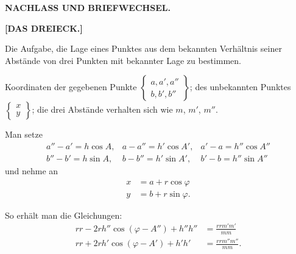 \begin{center}
\textbf{\Large NACHLASS UND BRIEFWECHSEL.}\par\bigskip
\textbf{[DAS DREIECK.]}
\end{center}
\bigskip

Die Aufgabe, die Lage eines Punktes aus dem bekannten Verhältnis seiner Abstände von drei Punkten mit bekannter Lage zu bestimmen.

Koordinaten der gegebenen Punkte $\left\{\begin{array}{c}a,a',a''\\b,b',b''\end{array}\right\}$; des unbekannten Punktes $\left\{\begin{array}{c}x\\y\end{array}\right\}$; die drei Abstände verhalten sich wie $m$, $m'$, $m''$.


Man setze
\[
\begin{array}{lll}
a''-a'=h\cos A,&a-a''=h'\cos A',&a'-a=h''\cos A''\\
b''-b'=h\sin A,&b-b''=h'\sin A',&b'-b=h''\sin A''
\end{array}
\]
\noindent und nehme an
\[
\begin{aligned}
x&=a+r\cos\varphi\\
y&=b+r\sin\varphi.
\end{aligned}
\]

So erhält man die Gleichungen:
\[
\begin{aligned}
rr-2rh''\cos(\varphi-A'')+h''h''&=\frac{rrm'm'}{mm}\\
rr+2rh'\cos(\varphi-A')+h'h'&=\frac{rrm''m''}{mm}.
\end{aligned}
\]
\begin{center}\end{center}
